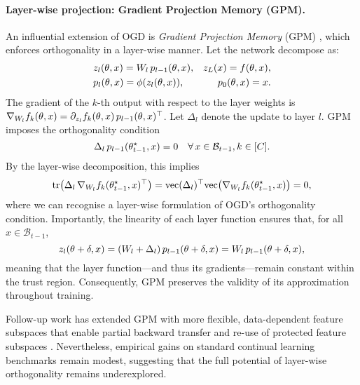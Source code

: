 \documentclass[10pt]{article} %
\newcommand{\memory}{\mathcal{B}}
\begin{document}
\paragraph{Layer-wise projection: Gradient Projection Memory (GPM).}
An influential extension of OGD is \emph{Gradient Projection Memory} (GPM) \citep{sahaGradientProjectionMemory2021}, which enforces orthogonality in a layer-wise manner.  
Let the network decompose as:
\begin{align*}
    & z_l(\theta, x) = W_l\, p_{l-1}(\theta, x), & z_L(x) = f(\theta, x),\\
    & p_l(\theta, x) = \phi(z_l(\theta, x)), & p_0(\theta, x) = x.
\end{align*}
The gradient of the $k$-th output with respect to the layer weights is
$\nabla_{W_l} f_k(\theta, x) = \partial_{z_l} f_k(\theta, x)\, p_{l-1}(\theta, x)^\top$.  
Let $\Delta_l$ denote the update to layer $l$.  
GPM imposes the orthogonality condition
\[
\Delta_l\, p_{l-1}(\param_{t-1}^\star, x) = 0
\quad \forall \, x \in \memory_{t-1}, k \in [C].
\]
By the layer-wise decomposition, this implies
\[
\mathrm{tr}\!\left(\Delta_l\, \nabla_{W_l} f_k(\theta_{t-1}^\star, x)^\top\right)
= \mathrm{vec}(\Delta_l)^\top 
  \mathrm{vec}\!\left(\nabla_{W_l} f_k(\theta_{t-1}^\star, x)\right) 
= 0,
\]
where we can recognise a layer-wise formulation of OGD’s orthogonality condition.  
Importantly, the linearity of each layer function ensures that, for all $x \in \memory_{t-1}$,
\[
z_l(\theta + \delta, x)
= (W_l + \Delta_l)\, p_{l-1}(\theta + \delta, x)
= W_l\, p_{l-1}(\theta + \delta, x),
\]
meaning that the layer function—and thus its gradients—remain constant within the trust region.  
Consequently, GPM preserves the validity of its approximation throughout training.


Follow-up work has extended GPM with more flexible, data-dependent feature subspaces that enable partial backward transfer and re-use of protected feature subspaces \citep{dengFlatteningSharpnessDynamic2021,linNotForgettingContinualLearning2022,linTRGPTrustRegion2022}.  
Nevertheless, empirical gains on standard continual learning benchmarks remain modest, suggesting that the full potential of layer-wise orthogonality remains underexplored.
\end{document}
